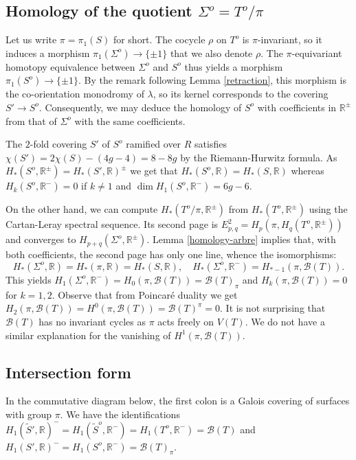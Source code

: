 \documentclass{amsart}
\newcommand{\R}{\mathbb{R}}
\newcommand{\Bb}{\mathcal{B}}
\begin{document}
\subsection{Homology of the quotient $\Sigma^o=T^o/\pi$}\label{homology-quotient}

Let us write $\pi=\pi_1(S)$ for short. The cocycle $\rho$ on $T^o$ is $\pi$-invariant, so it induces a morphism $\pi_1(\Sigma^o)\to \{\pm 1\}$ that we also denote $\rho$. The $\pi$-equivariant homotopy equivalence between $\Sigma^o$ and $S^o$ thus yields a morphism $\pi_1(S^o)\to\{\pm 1\}$. By the remark following Lemma \ref{retraction}, this morphism is the co-orientation monodromy of $\lambda$, so its kernel corresponds to the covering $S'\to S^o$.
%
Consequently, we may deduce the homology of $S^o$ with coefficients in $\R^{\pm}$ from that of $\Sigma^o$ with the same coefficients.


The $2$-fold covering $S'$ of $S^o$ ramified over $R$ satisfies $\chi(S')=2\chi(S)-(4g-4)=8-8g$ by the Riemann-Hurwitz formula. As $H_*(S^o,\R^\pm)=H_*(S',\R)^\pm$ we get that $H_*(S^o,\R)=H_*(S,\R)$ whereas $H_k(S^o,\R^-)=0$ if $k\ne 1$ and $\dim H_1(S^o,\R^-)=6g-6$.


On the other hand, we can compute $H_*(T^o/\pi,\R^{\pm})$ from $H_*(T^o,\R^{\pm})$ using the Cartan-Leray spectral sequence. Its second page is $E^2_{p,q}=H_p(\pi,H_q(T^o,\R^{\pm}))$ and converges to $H_{p+q}(\Sigma^o,\R^{\pm})$. Lemma \ref{homology-arbre} implies that, with both coefficients, the second page has only one line, whence the isomorphisms:
$$H_*(\Sigma^o,\R)=H_*(\pi,\R)=H_*(S,\R),\quad H_*(\Sigma^o,\R^-)=H_{*-1}(\pi,\Bb(T)).$$ 
This yields $H_1(\Sigma^o,\R^-)=H_0(\pi,\Bb(T))=\Bb(T)_\pi$ and $H_k(\pi,\Bb(T))=0$ for $k=1,2$. Observe that from Poincaré duality we get $H_2(\pi,\Bb(T))=H^0(\pi,\Bb(T))=\Bb(T)^\pi=0$. It is not surprising that $\Bb(T)$ has no invariant cycles as $\pi$ acts freely on $V(T)$. We do not have a similar explanation for the vanishing of $H^1(\pi,\Bb(T))$. 



\subsection{Intersection form}

In the commutative diagram below, the first colon is a Galois covering of surfaces with group $\pi$. We have the identifications $H_1(\tilde{S}',\R)^-=H_1(\tilde{S}^o,\R^-)=H_1(T^o,\R^-)=\Bb(T)$ and $H_1(S',\R)^-=H_1(S^o,\R^-)=\Bb(T)_\pi$.
\end{document}
